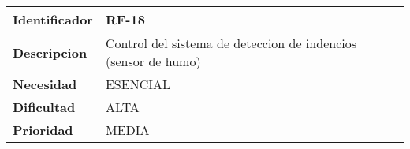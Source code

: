\begin{center}
    \begin{tabular}{|p{2.6cm}|p{12cm}|}
    \hline
    \textbf{Identificador} & RF-18\\
    \hline
    \textbf{Descripcion} & Control del sistema de deteccion de indencios (sensor de humo)\\
    \hline
    \textbf{Necesidad} & ESENCIAL\\
    \hline
    \textbf{Dificultad} & ALTA\\
    \hline
    \textbf{Prioridad} & MEDIA\\
    \hline
    \end{tabular}
\end{center}
